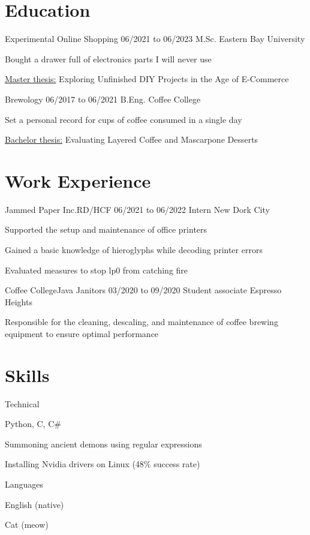 \section{Education}
\begin{resumeList}  {Experimental Online Shopping}{}    {06/2021 to 06/2023}
                    {M.Sc.}                             {Eastern Bay University}
    \item Bought a drawer full of electronics parts I will never use
    \item \underline{Master thesis:} Exploring Unfinished DIY Projects in the Age of E-Commerce
\end{resumeList}
\begin{resumeList}  {Brewology}{}    {06/2017 to 06/2021}
                    {B.Eng.}         {Coffee College}
    \item Set a personal record for cups of coffee consumed in a single day
    \item \underline{Bachelor thesis:} Evaluating Layered Coffee and Mascarpone Desserts
\end{resumeList}


\section{Work Experience}
\begin{resumeList}  {Jammed Paper Inc.}{RD/HCF}    {06/2021 to 06/2022}
                    {Intern}                       {New Dork City}
    \item Supported the setup and maintenance of office printers
    \item Gained a basic knowledge of hieroglyphs while decoding printer errors
    \item Evaluated measures to stop lp0 from catching fire
\end{resumeList}
\begin{resumeList}  {Coffee College}{Java Janitors}    {03/2020 to 09/2020}
                    {Student associate}                {Espresso Heights}
    \item Responsible for the cleaning, descaling, and maintenance of coffee brewing equipment to ensure optimal performance
\end{resumeList}


\section{Skills}
\begin{resumeList}{Technical}{}{}{}{}
    \item Python, C, C\#
    \item Summoning ancient demons using regular expressions
    \item Installing Nvidia drivers on Linux (48\% success rate)
\end{resumeList}

\begin{resumeList}{Languages}{}{}{}{}
    \item English (native)
    \item Cat (meow)
\end{resumeList}
